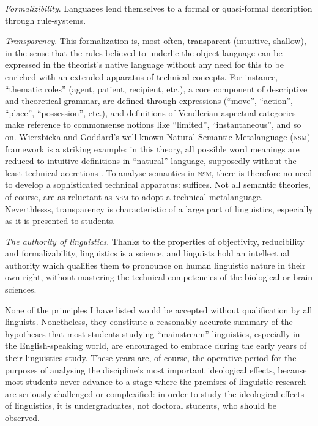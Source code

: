 \documentclass[output=paper]{langscibook}
\begin{document}
\emph{Formalizibility}. Languages lend themselves to a formal or quasi-formal description through rule-systems.

\emph{Transparency}. This formalization is, most often, transparent (intuitive, shallow), in the sense that the rules believed to underlie the object-language can be expressed in the theorist's native language without any need for this to be enriched with an extended apparatus of technical concepts. For instance, ``thematic roles'' (agent, patient, recipient, etc.), a core component of descriptive and theoretical grammar, are defined through  expressions (``move'', ``action'', ``place'', ``possession'', etc.), and definitions of Vendlerian aspectual categories make reference to commonsense notions like ``limited'', ``instantaneous'', and so on. Wierzbicka and Goddard's well known Natural Semantic Metalanguage (\textsc{nsm}) framework is a striking example: in this theory, all possible word meanings are reduced to intuitive definitions in ``natural'' language, supposedly without the least technical accretions \citep[see][]{Wierzbicka1996}. To analyse semantics in \textsc{nsm}, there is therefore no need to develop a sophisticated technical apparatus:  suffices. Not all semantic theories, of course, are as reluctant as \textsc{nsm} to adopt a technical metalanguage. Neverthlesss, transparency is characteristic of a large part of linguistics, especially as it is presented to students.

\emph{The authority of linguistics}. Thanks to the properties of objectivity, reducibility and formalizability, linguistics is a science, and linguists hold an intellectual authority which qualifies them to pronounce on human linguistic nature in their own right, without mastering the technical competencies of the biological or brain sciences.

None of the principles I have listed would be accepted without qualification by all linguists. Nonetheless, they constitute a reasonably accurate summary of the hypotheses that most students studying ``mainstream'' linguistics, especially in the English-speaking world, are encouraged to embrace during the early years of their linguistics study. These years are, of course, the operative period for the purposes of analysing the discipline's most important ideological effects, because most students never advance to a stage where the premises of linguistic research are seriously challenged or complexified: in order to study the ideological effects of linguistics, it is undergraduates, not doctoral students, who should be observed.
\end{document}

